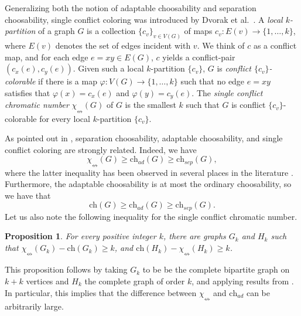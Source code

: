 \documentclass[12pt]{article}
\newtheorem{proposition}[theorem]{Proposition}
\newcommand{\single}{\chi_{\nleftrightarrow}}
\newcommand{\ch}{\mathrm{ch}}
\begin{document}
Generalizing both the notion of adaptable choosability and separation choosability,
single conflict coloring was introduced by Dvorak et al.\ \cite{DvorakEsperetKangOzeki}. 
A {\em local $k$-partition} of a graph $G$ is a collection $\{c_v\}_{v \in V(G)}$ of maps 
	$c_v : E(v) \to \{1,\dots, k\}$, where $E(v)$ denotes the set of edges incident
	with $v$. We think of $c$ as a conflict map, and for each
	edge $e = xy \in E(G)$, $c$ yields a conflict-pair 
	$(c_{x}(e), c_{y}(e))$. Given such a local $k$-partition $\{c_v\}$,
	$G$ is {\em conflict $\{c_v\}$-colorable} if there is a map 
	$\varphi: V(G) \to \{1,\dots, k\}$ such that no edge $e = xy$ 
	satisfies that $\varphi(x) = c_{x}(e)$ and $\varphi(y) = c_{y}(e)$.
	The {\em single conflict chromatic number} $\single(G)$ of
	$G$ is the smallest $k$ such that
	$G$ is conflict $\{c_v\}$-colorable for every local $k$-partition $\{c_v\}$.


As pointed out in \cite{DvorakEsperetKangOzeki}, separation choosability, 
adaptable choosability, and single conflict coloring are strongly related.
Indeed, we have
\begin{equation}
\label{eq:olika}
	\single(G) \geq \ch_{ad}(G) \geq \ch_{sep}(G),
\end{equation}
where the latter inequality has been observed in several places in the 
literature 	
\cite{EsperetKangThomasse, CasselgrenGranholmRaspaud, DvorakEsperetKangOzeki}.
Furthermore, the adaptable choosability is at most the ordinary 
choosability, so
we have that $$\ch(G) \geq \ch_{ad}(G) \geq \ch_{sep}(G).$$
Let us also note the following inequality for the single conflict chromatic number.

\begin{proposition}
\label{prop:chsingle}
	For every positive integer $k$, there are graphs $G_k$ and $H_k$
	such that $\single(G_k)- \ch(G_k) \geq k$, and $\ch(H_k) - \single(H_k) \geq k$.
\end{proposition}
	This proposition follows by taking $G_k$ to be 
         be the complete bipartite graph on $k+k$ vertices
	and $H_k$ the complete graph of order $k$, and applying results
	from \cite{DvorakEsperetKangOzeki, FurediKostochkaKumbhat}.
	In particular, this implies that the difference between
	$\single$ and $\ch_{ad}$ can be arbitrarily large.
\end{document}
